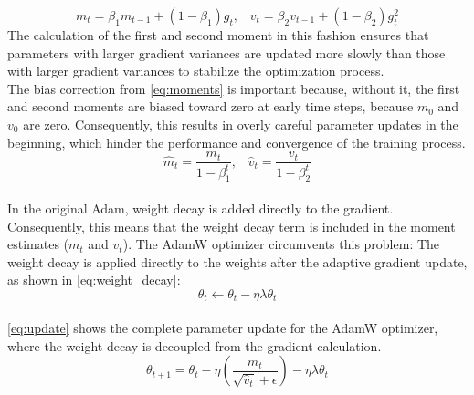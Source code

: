\begin{equation}
\label{eq:mean_var}
m_t = \beta_1 m_{t-1} + (1 - \beta_1) g_t \text{,} \quad v_t = \beta_2 v_{t-1} + (1 - \beta_2) g_t^2
\end{equation}
The calculation of the first and second moment in this fashion ensures that parameters with larger gradient variances are updated more slowly than those with larger gradient variances to stabilize the optimization process. \\
The bias correction from \cref{eq:moments} is important because, without it, the first and second moments are biased toward zero at early time steps, because \(m_0\) and \(v_0\) are zero. Consequently, this results in overly careful parameter updates in the beginning, which hinder the performance and convergence of the training process. \\
\begin{equation}
\hat{m}_t = \frac{m_t}{1 - \beta_1^t} \text{,} \quad \hat{v}_t = \frac{v_t}{1 - \beta_2^t}
\label{eq:moments}
\end{equation}
\\
In the original Adam, weight decay is added directly to the gradient. Consequently, this means that the weight decay term is included in the moment estimates (\(m_t\) and \(v_t\)). The AdamW optimizer circumvents this problem: The weight decay is applied directly to the weights after the adaptive gradient update, as shown in \cref{eq:weight_decay}:
\begin{equation}
\label{eq:weight_decay}
\theta_t \leftarrow \theta_t - \eta \lambda \theta_t
\end{equation}
\\
\cref{eq:update} shows the complete parameter update for the AdamW optimizer, where the weight decay is decoupled from the gradient calculation.
\begin{equation}
\label{eq:update}
\theta_{t+1} = \theta_t - \eta \left( \frac{\hat{m}_t}{\sqrt{\hat{v}_t} + \epsilon} \right) - \eta \lambda \theta_t
\end{equation}

